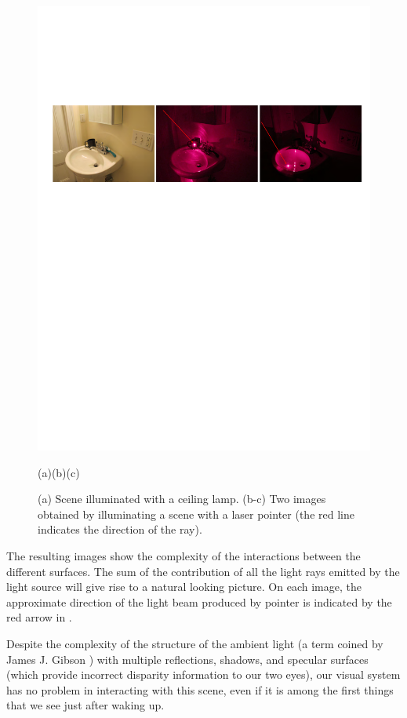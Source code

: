 \begin{figure}[t]
\centerline{
\includegraphics[width=1\linewidth]{figures/taxonomy/lightGray2.pdf}
}
\centerline{
(a)\hspace{1.5in}(b)\hspace{1.5in}(c)
} 
\caption{(a) Scene illuminated with a ceiling lamp. (b-c) Two images obtained by illuminating a scene with a laser pointer (the red line indicates the direction of the ray).} 
\label{fig:lightRay}
\end{figure}

The resulting images show the complexity of the interactions between the different surfaces. The sum of the contribution of all the light rays emitted by the light source will give rise to a natural looking picture. On each image, the approximate direction of the light beam produced by pointer is indicated by the red arrow in .  

Despite the complexity of the structure of the ambient light (a term coined by James J. Gibson \cite{Gibson1966}) with multiple reflections, shadows, and specular surfaces (which provide incorrect disparity information to our two eyes), our visual system has no problem in interacting with this scene, even if it is among the first things that we see just after waking up. 


